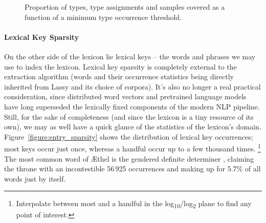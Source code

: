 \begin{figure}
	\centering
	\caption{Proportion of types, type assignments and samples covered as a function of a minimum type occurrence threshold.}
	\label{figure:ecdfs}
\end{figure}


\paragraph{Lexical Key Sparsity}
On the other side of the lexicon lie lexical keys -- the words and phrases we may use to index the lexicon.
Lexical key sparsity is completely external to the extraction algorithm (words and their occurrence statistics being directly inherited from Lassy and its choice of corpora).
It's also no longer a real practical consideration, since distributed word vectors and pretrained language models have long superseded the lexically fixed components of the modern NLP pipeline.
Still, for the sake of completeness (and since the lexicon is a tiny resource of its own), we may as well have a quick glance of the statistics of the lexicon's domain.
Figure~\ref{figure:entry_sparsity} shows the distribution of lexical key occurrences; most keys occur just once, whereas a handful occur up to a few thousand times.%
	\footnote{Interpolate between most and a handful in the log\textsubscript{10}/log\textsubscript{2} plane to find any point of interest.}
The most common word of \AE thel is the gendered definite determiner , claiming the throne with an incontestible 56\,925 occurrences and making up for 5.7\% of all words just by itself.

